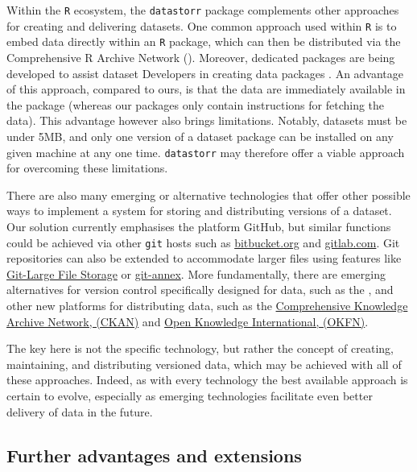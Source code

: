 \documentclass[a4paper,num-refs]{assets/oup-contemporary}
\begin{document}
Within the \texttt{R}  ecosystem, the \texttt{datastorr} package complements other approaches for creating and delivering datasets. One common approach used within \texttt{R} is to embed data directly within an \texttt{R} package, which can then be distributed via the Comprehensive R Archive Network (). Moreover, dedicated packages are being developed to assist dataset Developers in creating data packages \cite{Finak-2018}. An advantage of this approach, compared to ours, is that the data are immediately available in the package (whereas our packages only contain instructions for fetching the data). This advantage however also brings limitations. Notably, datasets must be under 5MB, and only one version of a dataset package can be installed on any given machine at any one time.  \texttt{datastorr} may therefore offer a viable approach for overcoming these limitations.

There are also many emerging or alternative technologies that offer other possible ways to implement a system for storing and distributing versions of a dataset. Our solution currently emphasises the platform GitHub, but similar functions could be achieved via other \texttt{git} hosts such as \href{http://bitbucket.org}{bitbucket.org} and \href{http://gitlab.com}{gitlab.com}. Git repositories can also be extended to accommodate larger files using  features like \href{https://git-lfs.github.com/}{Git-Large File Storage} or \href{http://git-annex.branchable.com/}{git-annex}. More fundamentally, there are  emerging alternatives for version control specifically designed for data, such as the , and other new platforms for distributing data, such as the \href{https://en.wikipedia.org/wiki/CKAN}{Comprehensive Knowledge Archive Network, (CKAN)} and \href{https://okfn.org/}{Open Knowledge International, (OKFN)}. 

The key here is not the specific technology, but rather the concept of creating, maintaining, and distributing versioned data, which may be achieved with all of these approaches. Indeed, as with every technology the best available approach is certain to evolve, especially as emerging technologies facilitate even better delivery of data in the future.

\subsection{Further advantages and extensions}
\end{document}
